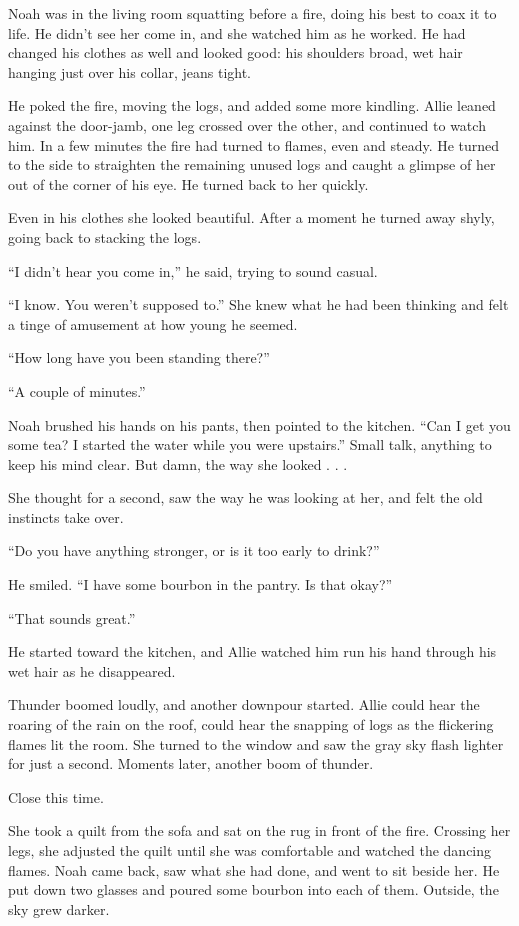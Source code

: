 \documentclass[10pt, twoside, openright]{book}
\begin{document}
Noah was in the living room squatting before a fire, doing his best to
coax it to life. He didn't see her come in, and she watched him as he
worked. He had changed his clothes as well and looked good: his
shoulders broad, wet hair hanging just over his collar, jeans tight.

He poked the fire, moving the logs, and added some more kindling. Allie
leaned against the door-jamb, one leg crossed over the other, and
continued to watch him. In a few minutes the fire had turned to flames,
even and steady. He turned to the side to straighten the remaining
unused logs and caught a glimpse of her out of the corner of his eye. He
turned back to her quickly.

Even in his clothes she looked beautiful. After a moment he turned away
shyly, going back to stacking the logs.


``I didn't hear you come in,'' he said, trying to sound casual.


``I know. You weren't supposed to.'' She knew what he had been thinking
and felt a tinge of amusement at how young he seemed.


``How long have you been standing there?''

``A couple of minutes.''


Noah brushed his hands on his pants, then pointed to the kitchen. ``Can
I get you some tea? I started the water while you were upstairs.'' Small
talk, anything to keep his mind clear. But damn, the way she looked . .
.

She thought for a second, saw the way he was looking at her, and felt
the old instincts take over.


``Do you have anything stronger, or is it too early to drink?''

He smiled. ``I have some bourbon in the pantry. Is that okay?''

``That sounds great.''


He started toward the kitchen, and Allie watched him run his hand
through his wet hair as he disappeared.

Thunder boomed loudly, and another downpour started. Allie could hear
the roaring of the rain on the roof, could hear the snapping of logs as
the flickering flames lit the room. She turned to the window and saw the
gray sky flash lighter for just a second. Moments later, another boom of
thunder.

Close this time.

She took a quilt from the sofa and sat on the rug in front of the fire.
Crossing her legs, she adjusted the quilt until she was comfortable and
watched the dancing flames. Noah came back, saw what she had done, and
went to sit beside her. He put down two glasses and poured some bourbon
into each of them. Outside, the sky grew darker.
\end{document}
